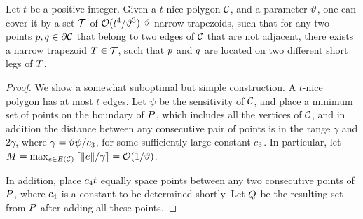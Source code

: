 \documentclass[12pt]{article}%
\begin{document}
\begin{lemma}
    Let $t$ be a positive integer.  Given a $t$-nice polygon $\mathcal{C}$,
    and a parameter $\vartheta$, one can cover it by a set $\mathcal{T}$ of
    $\mathcal{O}(t^4/\vartheta^3)$ $\vartheta$-narrow trapezoids, such that for any
    two points $p, q \in \partial \mathcal{C}$ that belong to two edges
    of $\mathcal{C}$ that are not adjacent, there exists a narrow trapezoid
    $T \in \mathcal{T}$, such that $p$ and $q$ are located on two
    different short legs of $T$.
\end{lemma}
\begin{proof}
    We show a somewhat suboptimal but simple construction. A $t$-nice
    polygon has at most $t$ edges.  Let $\psi$ be the sensitivity of
    $\mathcal{C}$, and place a minimum set of points on the boundary of
    $P$, which includes all the vertices of $\mathcal{C}$, and in addition
    the distance between any consecutive pair of points is in the
    range $\gamma$ and $2\gamma$, where
    $\gamma = \vartheta \psi/ c_3$, for some sufficiently large
    constant $c_3$. In particular, let
    $M =\max_{e \in \EGX{\Body}} \ceil{\| e\| / \gamma} = \Of(
    1/\epsA)$.

    In addition, place $c_4 t$ equally space points between any
    two consecutive points of $P$, where $c_4$ is a constant to
    be determined shortly. Let $Q$ be the resulting set from $P$
    after adding all these points.


\end{proof}
\end{document}
